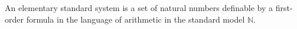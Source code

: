 An elementary standard system is a set of natural numbers definable by a first-order formula in the language of arithmetic in the standard model $\mathbb{N}$.
